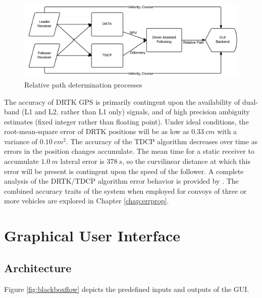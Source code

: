 \documentclass[12pt]{report}
\begin{document}
\begin{figure}[htbp]
    \centering
    \includegraphics[width=6.5in]{./figs/data_algo.png}
    \caption{Relative path determination processes}
    \label{fig:drtktdcp}
\end{figure}

The accuracy of DRTK GPS is primarily contingent upon the availability of dual-band (L1 and L2, rather than L1 only) signals, and of high precision ambiguity estimates (fixed integer rather than floating point). Under ideal conditions, the root-mean-square error of DRTK positions will be as low as $0.33~cm$ with a variance of $0.10~cm^2$. 
The accuracy of the TDCP algorithm decreases over time as errors in the position changes accumulate. The mean time for a static receiver to accumulate $1.0~m$ lateral error is $378~s$, so the curvilinear distance at which this error will be present is contingent upon the speed of the follower. A complete analysis of the DRTK/TDCP algorithm error behavior is provided by \cite{scottthesis}. The combined accuracy traits of the system when employed for convoys of three or more vehicles are explored in Chapter \ref{chap:errprop}.



\chapter{Graphical User Interface}

\section{Architecture}
Figure \ref{fig:blackboxflow} depicts the predefined inputs and outputs of the GUI.
\end{document}
